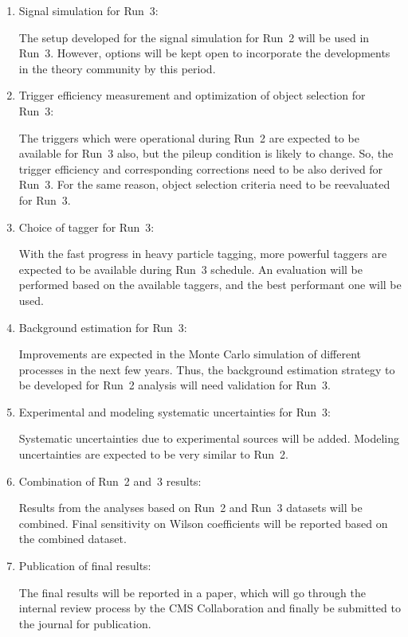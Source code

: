 \documentclass[a4paper,11pt]{article}
\begin{document}
{\begin{enumerate}
\item Signal simulation for Run~3:

The setup developed for the signal simulation for Run~2 will be used in Run~3. However, options will be kept open to incorporate the developments in the theory community by this period. 

\item Trigger efficiency measurement and optimization of object selection for Run~3: 

The triggers which were operational during Run~2 are expected to be available for Run~3 also, but the pileup condition is likely to change. So, the trigger efficiency and corresponding corrections need to be also derived for Run~3. 
For the same reason, object selection criteria need to be reevaluated for Run~3. 

\item Choice of \PH tagger for Run~3:

With the fast progress in heavy particle tagging, more powerful taggers are expected to be available during Run~3 schedule. An evaluation will be performed based on the available taggers, and the best performant one will be used. 

\item Background estimation for Run~3:

Improvements are expected in the Monte Carlo simulation of different processes in the next few years. Thus, the background estimation strategy to be developed for Run~2 analysis will need validation for Run~3.

\item Experimental and modeling systematic uncertainties for Run~3:

Systematic uncertainties due to experimental sources will be added. Modeling uncertainties are expected to be very similar to Run~2.

\item Combination of Run~2 and~3 results:

Results from the analyses based on Run~2 and Run~3 datasets will be combined. Final sensitivity on Wilson coefficients will be reported based on the combined dataset. 

\item Publication of final results:

The final results will be reported in a paper, which will go through the internal review process by the CMS Collaboration and finally be submitted to the journal for publication. 


\end{enumerate}}
\end{document}
